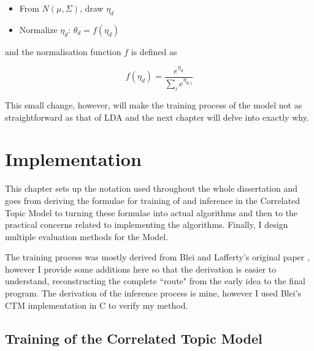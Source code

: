 \documentclass[12pt,a4paper,twoside,openright]{report}
\begin{document}
\begin{itemize}[noitemsep]
\item From $N(\mu, \Sigma)$, draw $\eta_d$
\item Normalize $\eta_d$: $\theta_d = f(\eta_d) $
\end{itemize}

and the normalisation function $f$ is defined as 

\begin{equation}\label{eq:normf}
f(\eta_d) = \frac{e^{\eta_d}}{\sum\limits_i e^{\eta_{d, i}}}
\end{equation}

This small change, however, will make the training process of the model not as straightforward as that of LDA and the next chapter will delve into exactly why.

\chapter{Implementation}

This chapter sets up the notation used throughout the whole dissertation and goes from deriving the formulae for training of and inference in the Correlated Topic Model to turning these formulae into actual algorithms and then to the practical concerns related to implementing the algorithms. Finally, I design multiple evaluation methods for the Model.

The training process was mostly derived from Blei and Lafferty's original paper \cite{2007}, however I provide some additions here so that the derivation is easier to understand, reconstructing the complete ``route" from the early idea to the final program. The derivation of the inference process is mine, however I used Blei's CTM implementation in C to verify my method.

\section{Training of the Correlated Topic Model}
\end{document}
